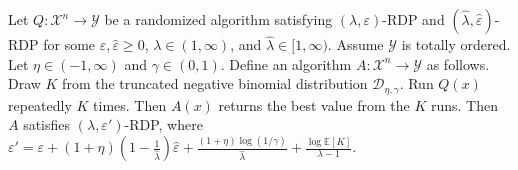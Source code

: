 Let $Q : \mathcal{X}^n \to \mathcal{Y}$ be a randomized algorithm satisfying $(\lambda,\varepsilon)$-RDP and $(\hat{\lambda},\hat{\varepsilon})$-RDP for some $\varepsilon,\hat{\varepsilon} \ge 0$, $\lambda \in (1,\infty)$, and $\hat{\lambda} \in [1,\infty)$. Assume $\mathcal{Y}$ is totally ordered. Let $\eta \in (-1,\infty)$ and $\gamma \in (0,1)$. Define an algorithm $A : \mathcal{X}^n \to \mathcal{Y}$ as follows. Draw $K$ from the truncated negative binomial distribution $\mathcal{D}_{\eta,\gamma}$. Run $Q(x)$ repeatedly $K$ times. Then $A(x)$ returns the best value from the $K$ runs. Then $A$ satisfies $(\lambda,\varepsilon')$-RDP, where $\varepsilon'=\varepsilon+(1+\eta)\!\left(1 - \frac{1}{\hat{\lambda}}\right)\hat{\varepsilon}+\frac{(1+\eta)\log(1/\gamma)}{\hat{\lambda}}+\frac{\log \mathbb{E}[K]}{\lambda - 1}.$
